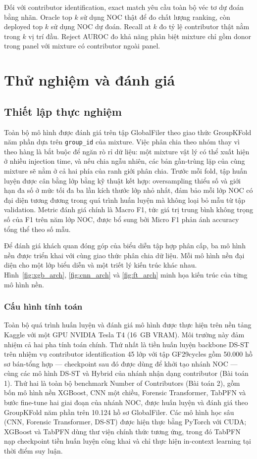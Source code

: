 \documentclass[12pt,a4paper]{article}
\begin{document}
Đối với contributor identification, exact match yêu cầu toàn bộ véc tơ dự đoán bằng nhãn. Oracle top \(k\) sử dụng NOC thật để đo chất lượng ranking, còn deployed top \(k\) sử dụng NOC dự đoán. Recall at \(k\) đo tỷ lệ contributor thật nằm trong \(k\) vị trí đầu. Reject AUROC đo khả năng phân biệt mixture chỉ gồm donor trong panel với mixture có contributor ngoài panel.

\section{Thử nghiệm và đánh giá}

\subsection{Thiết lập thực nghiệm}

Toàn bộ mô hình được đánh giá trên tập GlobalFiler theo giao thức GroupKFold năm phần dựa trên \texttt{group\_id} của mixture. Việc phân chia theo nhóm thay vì theo hàng là bắt buộc để ngăn rò rỉ dữ liệu: một mixture vật lý có thể xuất hiện ở nhiều injection time, và nếu chia ngẫu nhiên, các bản gần-trùng lặp của cùng mixture sẽ nằm ở cả hai phía của ranh giới phân chia. Trước mỗi fold, tập huấn luyện được cân bằng lớp bằng kỹ thuật kết hợp: oversampling thiểu số và giới hạn đa số ở mức tối đa ba lần kích thước lớp nhỏ nhất, đảm bảo mỗi lớp NOC có đại diện tương đương trong quá trình huấn luyện mà không loại bỏ mẫu từ tập validation. Metric đánh giá chính là Macro F1, tức giá trị trung bình không trọng số của F1 trên năm lớp NOC, được bổ sung bởi Micro F1 phản ánh accuracy tổng thể theo số mẫu.

Để đánh giá khách quan đóng góp của biểu diễn tập hợp phân cấp, ba mô hình nền được triển khai với cùng giao thức phân chia dữ liệu. Mỗi mô hình nền đại diện cho một lớp biểu diễn và một triết lý kiến trúc khác nhau. Hình~\ref{fig:xgb_arch}, \ref{fig:cnn_arch} và \ref{fig:ft_arch} minh họa kiến trúc của từng mô hình nền.

\subsubsection{Cấu hình tính toán}

Toàn bộ quá trình huấn luyện và đánh giá mô hình được thực hiện trên nền tảng Kaggle với một GPU NVIDIA Tesla T4 (16~GB VRAM). Môi trường này đảm nhiệm cả hai pha tính toán chính. Thứ nhất là tiền huấn luyện backbone DS-ST trên nhiệm vụ contributor identification 45 lớp với tập GF29cycles gồm 50.000 hồ sơ bán-tổng hợp — checkpoint sau đó được dùng để khởi tạo nhánh NOC — cùng các mô hình DS-ST và Hybrid của nhánh nhận dạng contributor (Bài toán 1). Thứ hai là toàn bộ benchmark Number of Contributors (Bài toán 2), gồm bốn mô hình nền XGBoost, CNN một chiều, Forensic Transformer, TabPFN và bước fine-tune hai giai đoạn của nhánh NOC, được huấn luyện và đánh giá theo GroupKFold năm phần trên 10.124 hồ sơ GlobalFiler. Các mô hình học sâu (CNN, Forensic Transformer, DS-ST) được hiện thực bằng PyTorch với CUDA; XGBoost và TabPFN dùng thư viện chính thức tương ứng, trong đó TabPFN nạp checkpoint tiền huấn luyện công khai và chỉ thực hiện in-context learning tại thời điểm suy luận.
\end{document}
